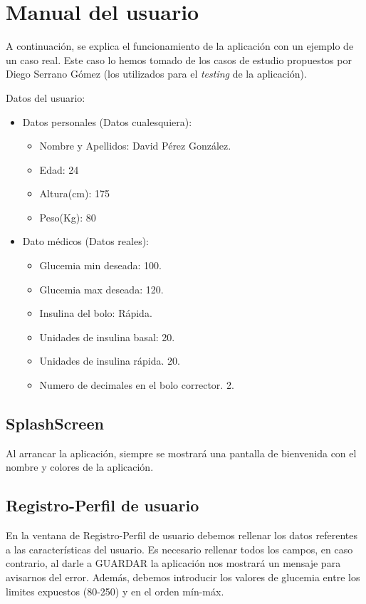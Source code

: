 \section{Manual del usuario}\label{sec:manualuser}
A continuación, se explica el funcionamiento de la aplicación con un ejemplo de un caso real. Este caso lo hemos tomado de los casos de estudio propuestos por Diego Serrano Gómez (los utilizados para el \textit{testing} de la aplicación).

Datos del usuario:
\begin{itemize}
	\item Datos personales (Datos cualesquiera):
	\begin{itemize}
		\item Nombre y Apellidos: David Pérez González. 
		\item Edad: 24
		\item Altura(cm): 175
		\item Peso(Kg): 80
	\end{itemize}
	\item Dato médicos (Datos reales):
	\begin{itemize}
		\item Glucemia min deseada: 100.
		\item Glucemia max deseada: 120.
		\item Insulina del bolo: Rápida.
		\item Unidades de insulina basal: 20.
		\item Unidades de insulina rápida. 20.
		\item Numero de decimales en el bolo corrector. 2.
	\end{itemize}
\end{itemize}
\subsection{SplashScreen}
Al arrancar la aplicación, siempre se mostrará una pantalla de bienvenida con el nombre y colores de la aplicación.
\subsection{Registro-Perfil de usuario}\label{ssec:registroperfil}
En la ventana de Registro-Perfil de usuario debemos rellenar los datos referentes a las características del usuario. Es necesario rellenar todos los campos, en caso contrario, al darle a GUARDAR la aplicación nos mostrará un mensaje para avisarnos del error. Además, debemos introducir los valores de glucemia entre los limites expuestos (80-250) y en el orden mín-máx.

